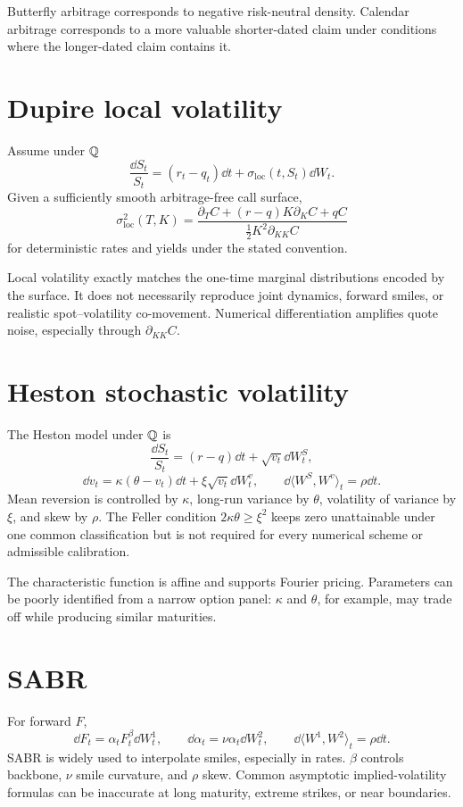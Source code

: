 Butterfly arbitrage corresponds to negative risk-neutral density. Calendar arbitrage
corresponds to a more valuable shorter-dated claim under conditions where the
longer-dated claim contains it.

\section{Dupire local volatility}

Assume under $\mathbb Q$
\[
\frac{\dd S_t}{S_t}=(r_t-q_t)\dd t+\sigma_{\mathrm{loc}}(t,S_t)\dd W_t.
\]
Given a sufficiently smooth arbitrage-free call surface,
\[
\sigma_{\mathrm{loc}}^2(T,K)=
\frac{\partial_T C+(r-q)K\partial_K C+qC}
{\frac12K^2\partial_{KK}C}
\]
for deterministic rates and yields under the stated convention.

Local volatility exactly matches the one-time marginal distributions encoded by the
surface. It does not necessarily reproduce joint dynamics, forward smiles, or
realistic spot--volatility co-movement. Numerical differentiation amplifies quote
noise, especially through $\partial_{KK}C$.

\section{Heston stochastic volatility}

The Heston model under $\mathbb Q$ is
\[
\frac{\dd S_t}{S_t}=(r-q)\dd t+\sqrt{v_t}\dd W_t^S,
\]
\[
\dd v_t=\kappa(\theta-v_t)\dd t+\xi\sqrt{v_t}\dd W_t^v,\qquad
\dd\langle W^S,W^v\rangle_t=\rho\dd t.
\]
Mean reversion is controlled by $\kappa$, long-run variance by $\theta$, volatility
of variance by $\xi$, and skew by $\rho$. The Feller condition
$2\kappa\theta\geq\xi^2$ keeps zero unattainable under one common classification but
is not required for every numerical scheme or admissible calibration.

The characteristic function is affine and supports Fourier pricing. Parameters can
be poorly identified from a narrow option panel: $\kappa$ and $\theta$, for example,
may trade off while producing similar maturities.

\section{SABR}

For forward $F$,
\[
\dd F_t=\alpha_tF_t^\beta\dd W_t^1,\qquad
\dd\alpha_t=\nu\alpha_t\dd W_t^2,\qquad
\dd\langle W^1,W^2\rangle_t=\rho\dd t.
\]
SABR is widely used to interpolate smiles, especially in rates. $\beta$ controls
backbone, $\nu$ smile curvature, and $\rho$ skew. Common asymptotic implied-volatility
formulas can be inaccurate at long maturity, extreme strikes, or near boundaries.

